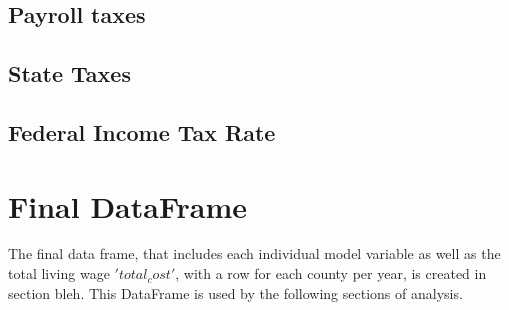 \subsection{Payroll taxes}

\subsection{State Taxes}

\subsection{Federal Income Tax Rate}

\section{Final DataFrame}

The final data frame, that includes each individual model variable as well as the total living wage \('total_cost'\), with a row for each county per year, is created in section bleh. This DataFrame is used by the following sections of analysis.